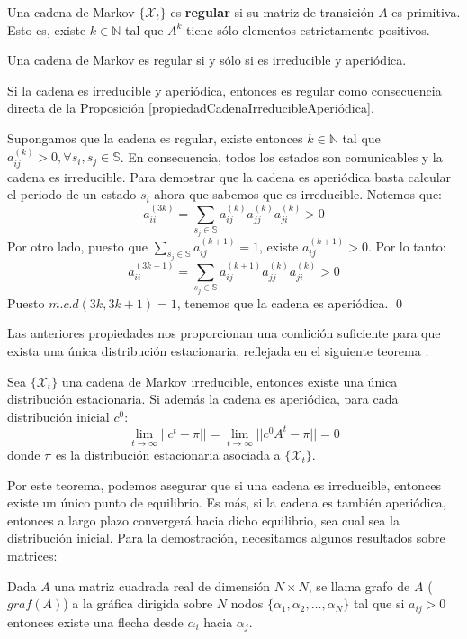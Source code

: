 \begin{definition}
Una cadena de Markov $\{\mathcal{X}_t\}$ es \textbf{regular} si su matriz de transición $A$ es primitiva. Esto es, existe $k\in\mathbb{N}$ tal que $A^k$ tiene sólo elementos estrictamente positivos.
\end{definition}

\begin{corollary}
    Una cadena de Markov es regular si y sólo si es irreducible y aperiódica.
\end{corollary}
\begin{proofs*}
Si la cadena es irreducible y aperiódica, entonces es regular como consecuencia directa de la Proposición \ref{propiedadCadenaIrreducibleAperiódica}.

Supongamos que la cadena es regular, existe entonces $k\in\mathbb{N}$ tal que $a_{ij}^{(k)}>0, \forall s_i,s_j\in\mathbb{S}$. En consecuencia, todos los estados son comunicables y la cadena es irreducible. Para demostrar que la cadena es aperiódica basta calcular el periodo de un estado $s_i$ ahora que sabemos que es irreducible. Notemos que:
\[a_{ii}^{(3k)}=\sum_{s_j\in\mathbb{S}}a_{ij}^{(k)} a_{jj}^{(k)} a_{ji}^{(k)}>0\]
Por otro lado, puesto que $\displaystyle\sum_{s_j\in\mathbb{S}}a_{ij}^{(k+1)}=1$, existe $a_{ij}^{(k+1)}>0$. Por lo tanto:
\[a_{ii}^{(3k+1)}=\sum_{s_j\in\mathbb{S}}a_{ij}^{(k+1)} a_{jj}^{(k)} a_{ji}^{(k)}>0\]
Puesto $m.c.d(3k,3k+1)=1$, tenemos que la cadena es aperiódica. \qed
\end{proofs*}


Las anteriores propiedades nos proporcionan una condición suficiente para que exista una única distribución estacionaria, reflejada en el siguiente teorema \cite[Página 12]{JavierP}:
\begin{theorem}\label{ComportamientoAsintóticoMarkovIrreducible}
    Sea $\{\mathcal{X}_t\}$ una cadena de Markov irreducible, entonces existe una única distribución estacionaria. Si además la cadena es aperiódica, para cada distribución inicial $c^0$:
    \[\lim_{t\rightarrow\infty}||c^t-\pi||=\lim_{t\rightarrow\infty}||c^0A^t-\pi||=0\]
    donde $\pi$ es la distribución estacionaria asociada a $\{\mathcal{X}_t\}$.
\end{theorem}

Por este teorema, podemos asegurar que si una cadena es irreducible, entonces existe un único punto de equilibrio. Es más, si la cadena es también aperiódica, entonces a largo plazo convergerá hacia dicho equilibrio, sea cual sea la distribución inicial. Para la demostración, necesitamos algunos resultados sobre matrices:
\begin{definition}
Dada $A$ una matriz cuadrada real de dimensión $N\times N$, se llama grafo de $A$ ($graf(A)$) a la gráfica dirigida sobre $N$ nodos $\{\alpha_1, \alpha_2, \dots,\alpha_N\}$ tal que si $a_{ij}>0$ entonces existe una flecha desde $\alpha_i$ hacia $\alpha_j$.
\end{definition}

